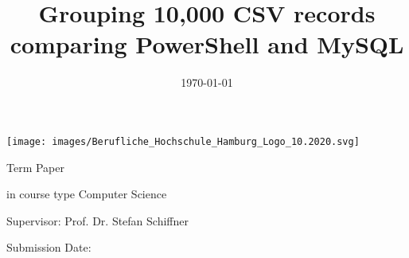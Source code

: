 \begin{center}
    \texttt{[image: images/Berufliche\_Hochschule\_Hamburg\_Logo\_10.2020.svg]}
\end{center}

\vspace*{10mm}
\begin{center}
\end{center}
\vspace*{10mm}

\title{Grouping 10,000 CSV records\\ \vspace{0,1cm} \large comparing PowerShell and MySQL}
\date{\vspace{-3ex}}
{\let\newpage\relax\maketitle}
\thispagestyle{empty}

\begin{center}
\begin{large}
\begin{Large}
Term Paper\\
\end{Large}
in course type Computer Science \\
\end{large}
\end{center}
\vspace{1cm}
\begin{center}
\begin{large}
Supervisor: Prof. Dr. Stefan Schiffner\\
\end{large}
\end{center}
\begin{center}
\begin{large}
\end{large}
\end{center}

\begin{center}
\begin{large}
Submission Date: \date{\today} \\
\end{large}
\end{center}

\vspace{1,5cm}